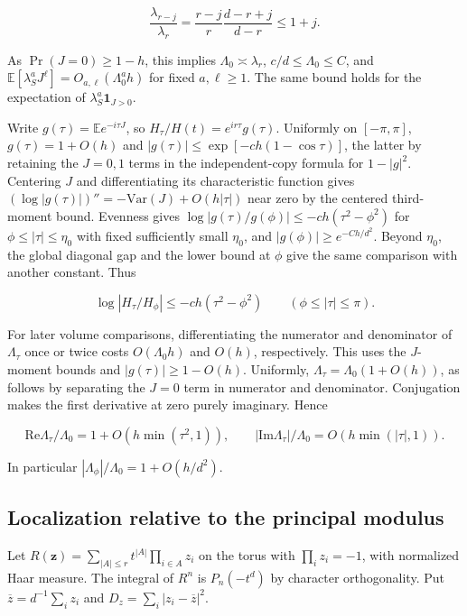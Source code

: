 \begin{equation*}
\frac{\lambda_{r-j}}{\lambda_r}
=\frac{r-j}{r}\frac{d-r+j}{d-r}\le1+j.
\end{equation*}

As $\Pr(J=0)\ge1-h$, this implies $\Lambda_0\asymp\lambda_r$, $c/d\le\Lambda_0\le C$, and $\mathbb E[\lambda_S^a J^\ell]=O_{a,\ell}(\Lambda_0^a h)$ for fixed $a,\ell\ge1$. The same bound holds for the expectation of $\lambda_S^a\mathbf1_{J>0}$.

Write $g(\tau)=\mathbb E e^{-i\tau J}$, so $H_\tau/H(t)=e^{ir\tau}g(\tau)$. Uniformly on $[-\pi,\pi]$, $g(\tau)=1+O(h)$ and $|g(\tau)|\le\exp[-ch(1-\cos\tau)]$, the latter by retaining the $J=0,1$ terms in the independent-copy formula for $1-|g|^2$. Centering $J$ and differentiating its characteristic function gives $(\log|g(\tau)|)''=-\mathrm{Var}(J)+O(h|\tau|)$ near zero by the centered third-moment bound. Evenness gives $\log|g(\tau)/g(\phi)|\le-ch(\tau^2-\phi^2)$ for $\phi\le|\tau|\le\eta_0$ with fixed sufficiently small $\eta_0$, and $|g(\phi)|\ge e^{-Ch/d^2}$. Beyond $\eta_0$, the global diagonal gap and the lower bound at $\phi$ give the same comparison with another constant. Thus

\begin{equation}
\log|H_\tau/H_\phi|\le-ch(\tau^2-\phi^2)
\qquad(\phi\le|\tau|\le\pi).
\tag{S2}
\end{equation}

For later volume comparisons, differentiating the numerator and denominator of $\Lambda_\tau$ once or twice costs $O(\Lambda_0h)$ and $O(h)$, respectively. This uses the $J$-moment bounds and $|g(\tau)|\ge1-O(h)$. Uniformly, $\Lambda_\tau=\Lambda_0(1+O(h))$, as follows by separating the $J=0$ term in numerator and denominator. Conjugation makes the first derivative at zero purely imaginary. Hence

\begin{equation}
\mathrm{Re}\Lambda_\tau/\Lambda_0=1+O(h\min(\tau^2,1)),\qquad
|\mathrm{Im}\Lambda_\tau|/\Lambda_0=O(h\min(|\tau|,1)).
\tag{S3}
\end{equation}

In particular $|\Lambda_\phi|/\Lambda_0=1+O(h/d^2)$.

\subsection{Localization relative to the principal modulus}

Let $R(\mathbf z)=\sum_{|A|\le r}t^{|A|}\prod_{i\in A}z_i$ on the torus with $\prod_i z_i=-1$, with normalized Haar measure. The integral of $R^n$ is $P_n(-t^d)$ by character orthogonality. Put $\overline z=d^{-1}\sum_i z_i$ and $D_z=\sum_i|z_i-\overline z|^2$.

